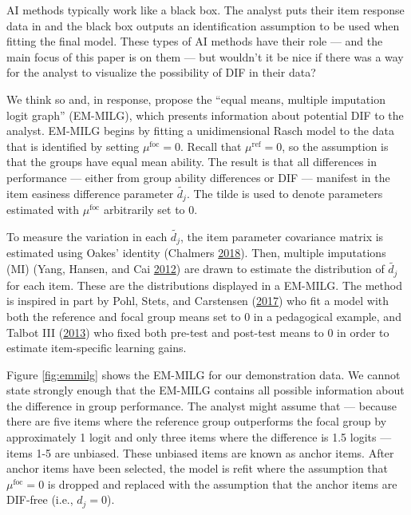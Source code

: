 \documentclass[
  11pt,
]{article}
\begin{document}
AI methods typically work like a black box. The analyst puts their item response data in and the black box outputs an identification assumption to be used when fitting the final model. These types of AI methods have their role --- and the main focus of this paper is on them --- but wouldn't it be nice if there was a way for the analyst to visualize the possibility of DIF in their data?

We think so and, in response, propose the \enquote{equal means, multiple imputation logit graph} (EM-MILG), which presents information about potential DIF to the analyst. EM-MILG begins by fitting a unidimensional Rasch model to the data that is identified by setting \(\mu^\text{foc} = 0\). Recall that \(\mu^\text{ref} = 0\), so the assumption is that the groups have equal mean ability. The result is that all differences in performance --- either from group ability differences or DIF --- manifest in the item easiness difference parameter \(\tilde{d_j}\). The tilde is used to denote parameters estimated with \(\mu^\text{foc}\) arbitrarily set to \(0\).

To measure the variation in each \(\tilde{{d_j}}\), the item parameter covariance matrix is estimated using Oakes' identity (Chalmers \protect\hyperlink{ref-chalmers2018numerical}{2018}). Then, multiple imputations (MI) (Yang, Hansen, and Cai \protect\hyperlink{ref-yang2012characterizing}{2012}) are drawn to estimate the distribution of \(\tilde{d_j}\) for each item. These are the distributions displayed in a EM-MILG. The method is inspired in part by Pohl, Stets, and Carstensen (\protect\hyperlink{ref-pohl2017cluster}{2017}) who fit a model with both the reference and focal group means set to 0 in a pedagogical example, and Talbot III (\protect\hyperlink{ref-talbot2013taking}{2013}) who fixed both pre-test and post-test means to 0 in order to estimate item-specific learning gains.

Figure \ref{fig:emmilg} shows the EM-MILG for our demonstration data. We cannot state strongly enough that the EM-MILG contains all possible information about the difference in group performance. The analyst might assume that --- because there are five items where the reference group outperforms the focal group by approximately 1 logit and only three items where the difference is 1.5 logits --- items 1-5 are unbiased. These unbiased items are known as anchor items. After anchor items have been selected, the model is refit where the assumption that \(\mu^\text{foc} = 0\) is dropped and replaced with the assumption that the anchor items are DIF-free (i.e., \(d_j = 0\)).
\end{document}
